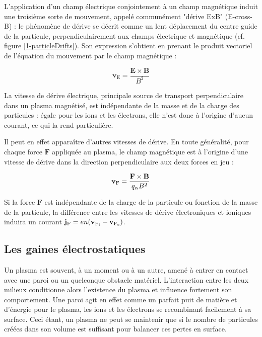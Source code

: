 \begin{refsection}
L'application d'un champ électrique conjointement à un champ magnétique
induit une troisième sorte de mouvement, appelé communément "dérive
ExB" (E-cross-B) : le phénomène de dérive se décrit comme un lent déplacement du
centre guide de la particule, perpendiculairement aux champs électrique et
magnétique (cf. figure \ref{1-particleDrifts}). Son expression s'obtient en
prenant le produit vectoriel de l'équation du mouvement par le champ magnétique
:

\begin{equation}
\mathbf{v}_\text{E}=\frac{\mathbf{E}\times\mathbf{B}}{B^2}
\end{equation}

La vitesse de dérive électrique, principale source de transport perpendiculaire
dans un plasma magnétisé, est indépendante de la masse et de la charge des
particules : égale pour les ions et les électrons, elle n'est donc à
l'origine d'aucun courant, ce qui la rend particulière. 

Il peut en effet apparaître d'autres vitesses de dérive. En toute généralité, 
pour chaque force $\mathbf F$ appliquée au plasma, le champ magnétique est à
l'origine d'une vitesse de dérive dans la direction perpendiculaire aux deux
forces en jeu :

\begin{equation}
\mathbf{v}{_{\text{F}}}=\frac{\mathbf{F}\times\mathbf{B}}{q_\alpha B^2}
\end{equation}

Si la force $\mathbf F$ est indépendante de la charge de la particule ou
fonction de la masse de la particule, la différence entre les vitesses de dérive
électroniques et ioniques induira un courant $\mathbf
j{_{\text{F}}}=en(\mathbf v{_{\text{F}_\text{i}}}-\mathbf
v{_{\text{F}_\text{e}}})$. 

\subsection{Les gaines électrostatiques}
\label{1-gaines}
Un plasma est souvent, à un moment ou à un autre, amené à entrer en contact avec
une paroi ou un quelconque obstacle matériel. L'interaction entre
les deux milieux conditionne alors l'existence du plasma et influence
fortement son comportement. Une paroi agit en effet comme un parfait
puit de matière et d'énergie pour le plasma, les ions et les électrons se
recombinant facilement à sa surface. Ceci étant, un plasma ne peut se maintenir
que si le nombre de particules créées dans son volume est suffisant pour
balancer ces pertes en surface. 


\end{refsection}
